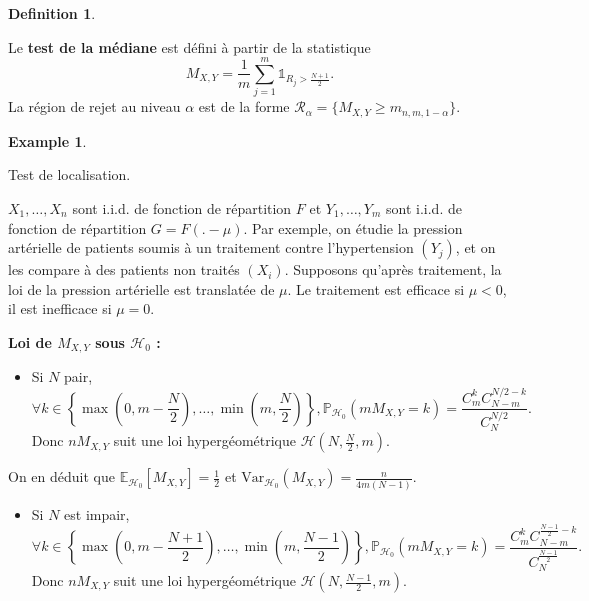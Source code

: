\documentclass[
]{book}
\providecommand{\tightlist}{%
  \setlength{\itemsep}{0pt}\setlength{\parskip}{0pt}}
\theoremstyle{definition}
\newtheorem{definition}{Definition}[chapter]
\theoremstyle{definition}
\newtheorem{example}{Example}[chapter]
\theoremstyle{definition}
\theoremstyle{definition}
\theoremstyle{remark}
\begin{document}
\begin{definition}
\protect\hypertarget{def:unlabeled-div-36}{}\label{def:unlabeled-div-36}

Le \textbf{test de la médiane} est défini à partir de la statistique
\[ M_{X,Y}= \frac1m \sum_{j=1}^m \mathbb{1}_{R_j >\frac{N+1}{2}}.\]
La région de rejet au niveau \(\alpha\) est de la forme \(\mathcal R_\alpha = \{M_{X,Y} \geq m_{n,m,1-\alpha}\}\).

\end{definition}

\begin{example}
\protect\hypertarget{exm:unlabeled-div-37}{}\label{exm:unlabeled-div-37}

Test de localisation.

\(X_1, \ldots, X_n\) sont i.i.d. de fonction de répartition \(F\) et \(Y_1, \ldots, Y_m\) sont i.i.d. de fonction de répartition \(G=F(.-\mu)\). Par exemple, on étudie la pression artérielle de patients soumis à un traitement contre l'hypertension \((Y_j)\), et on les compare à des patients non traités \((X_i)\). Supposons qu'après traitement, la loi de la pression artérielle est translatée de \(\mu\). Le traitement est efficace si \(\mu <0\), il est inefficace si \(\mu=0\).

\end{example}

\textbf{Loi de \(M_{X,Y}\) sous \(\mathcal{H}_0\) :}

\begin{itemize}
\tightlist
\item
  Si \(N\) pair,\\
  \[
  \forall k\in \left\{ \max(0, m - \frac N 2),\ldots,\min(m, \frac N 2)\right\}, \mathbb{P}_{\mathcal{H}_0}(m M_{X,Y}=k)=\frac{C_m^k C_{N-m}^{N/2-k}}{C_{N}^{N/2}}.
  \]
  Donc \(n M_{X,Y}\) suit une loi hypergéométrique \(\mathcal{H}(N,\frac N 2, m)\).
\end{itemize}

On en déduit que \(\mathbb{E}_{\mathcal{H}_0}[M_{X,Y}] = \frac 1 2\) et \(\mbox{Var}_{\mathcal{H}_0}(M_{X,Y}) = \frac{n}{4m(N-1)}\).

\begin{itemize}
\tightlist
\item
  Si \(N\) est impair,\\
  \[
  \forall k\in \left\{ \max(0,m- \frac{N+1}{ 2}),\ldots,\min(m, \frac{N-1}{ 2}) \right\}, \mathbb{P}_{\mathcal{H}_0}(m M_{X,Y}=k)=\frac{C_m^k C_{N-m}^{\frac{N-1}{2}-k}}{C_{N}^{\frac{N-1}{2}}}.
  \]
  Donc \(n M_{X,Y}\) suit une loi hypergéométrique \(\mathcal{H}(N,\frac{N-1}{2}, m)\).
\end{itemize}
\end{document}

